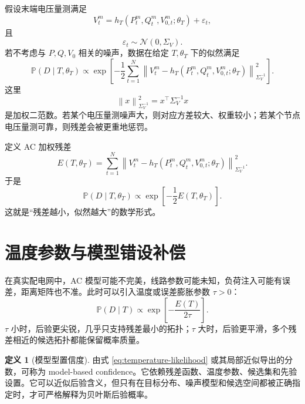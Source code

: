\documentclass[UTF8,12pt,openany]{ctexrep}
\numberwithin{equation}{chapter}
\theoremstyle{definition}
\newtheorem{definition}{定义}[chapter]
\theoremstyle{plain}
\newcommand{\Prob}{\mathbb{P}}
\newcommand{\norm}[2][]{\left\lVert #2 \right\rVert_{#1}}
\begin{document}
假设末端电压量测满足
\begin{equation}
V_t^m
=h_T(P_t^m,Q_t^m,V_{0,t}^m;\theta_T)+\varepsilon_t,
\label{eq:voltage-observation}
\end{equation}
且
\begin{equation}
\varepsilon_t\sim\mathcal{N}(0,\Sigma_V).
\label{eq:voltage-noise}
\end{equation}
若不考虑与 $P,Q,V_0$ 相关的噪声，数据在给定 $T,\theta_T$ 下的似然满足
\begin{equation}
\Prob(D\mid T,\theta_T)
\propto
\exp\left[
-\frac{1}{2}
\sum_{t=1}^{N}
\norm[\Sigma_V^{-1}]{
V_t^m-h_T(P_t^m,Q_t^m,V_{0,t}^m;\theta_T)
}^2
\right].
\label{eq:ac-likelihood}
\end{equation}
这里
\begin{equation}
\norm[\Sigma_V^{-1}]{x}^2=x^\top\Sigma_V^{-1}x
\end{equation}
是加权二范数。若某个电压量测噪声大，则对应方差较大、权重较小；若某个节点电压量测可靠，则残差会被更重地惩罚。

定义 AC 加权残差
\begin{equation}
E(T,\theta_T)
=
\sum_{t=1}^{N}
\norm[\Sigma_V^{-1}]{
V_t^m-h_T(P_t^m,Q_t^m,V_{0,t}^m;\theta_T)
}^2.
\label{eq:weighted-ac-residual}
\end{equation}
于是
\begin{equation}
\Prob(D\mid T,\theta_T)
\propto \exp\left[-\frac{1}{2}E(T,\theta_T)\right].
\label{eq:likelihood-residual}
\end{equation}
这就是“残差越小，似然越大”的数学形式。

\section{温度参数与模型错设补偿}

在真实配电网中，AC 模型可能不完美，线路参数可能未知，负荷注入可能有误差，距离矩阵也不准。此时可以引入温度或误差膨胀参数 $\tau>0$：
\begin{equation}
\Prob(D\mid T)
\propto
\exp\left[-\frac{E(T)}{2\tau}\right].
\label{eq:temperature-likelihood}
\end{equation}
$\tau$ 小时，后验更尖锐，几乎只支持残差最小的拓扑；$\tau$ 大时，后验更平滑，多个残差相近的候选拓扑都能保留概率质量。

\begin{definition}[模型型置信度]
由式 \eqref{eq:temperature-likelihood} 或其局部近似导出的分数，可称为 model-based confidence。它依赖残差函数、温度参数、候选集和先验设置。它可以近似后验含义，但只有在目标分布、噪声模型和候选空间都被正确指定时，才可严格解释为贝叶斯后验概率。
\end{definition}
\end{document}
